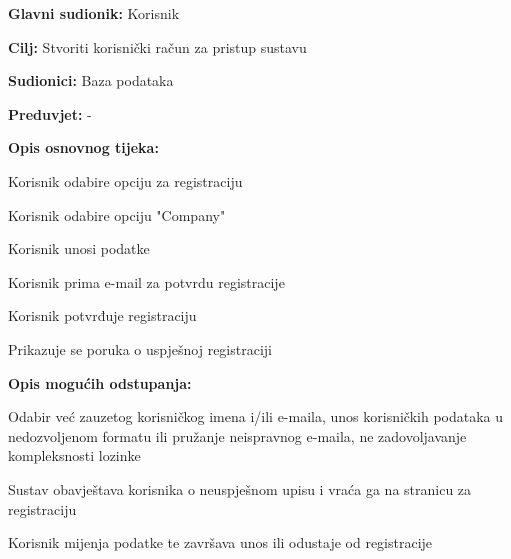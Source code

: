 					\noindent {}
					\begin{packed_item}
	
						\item \textbf{Glavni sudionik: }Korisnik
						\item  \textbf{Cilj:} Stvoriti korisnički račun za pristup sustavu
						\item  \textbf{Sudionici:} Baza podataka
						\item  \textbf{Preduvjet:} -
						\item  \textbf{Opis osnovnog tijeka:}
						
						\item[] \begin{packed_enum}
	
							\item Korisnik odabire opciju za registraciju
							\item Korisnik odabire opciju "Company"
							\item Korisnik unosi podatke
							\item Korisnik prima e-mail za potvrdu registracije
							\item Korisnik potvrđuje registraciju
							\item Prikazuje se poruka o uspješnoj registraciji

						\end{packed_enum}
						
						\item  \textbf{Opis mogućih odstupanja:}
						
						\item[] \begin{packed_item}
	
							\item[2.a] Odabir već zauzetog korisničkog imena i/ili e-maila, unos korisničkih podataka u nedozvoljenom formatu ili pružanje neispravnog e-maila, ne zadovoljavanje kompleksnosti lozinke
							\item[] \begin{packed_enum}
								
								\item Sustav obavještava korisnika o neuspješnom upisu i vraća ga na stranicu za registraciju
								\item Korisnik mijenja podatke te završava unos ili odustaje od registracije
								
							\end{packed_enum}
							
						\end{packed_item}
					\end{packed_item}
					
